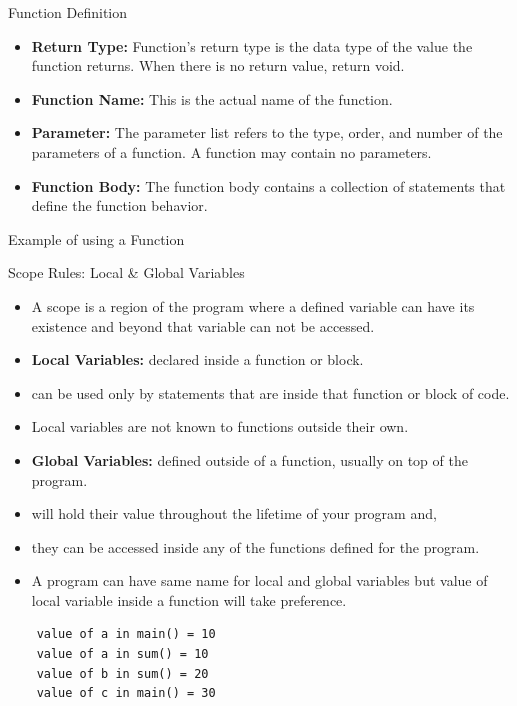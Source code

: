 \documentclass[10pt,t]{beamer}
\begin{document}
\begin{frame}[fragile]{Function Definition}
  \begin{itemize}
  \item \textbf{Return Type:} Function's return type is the data type of the value the function returns. When there is no return value, return void.
  \item \textbf{Function Name:} This is the actual name of the function.
  \item \textbf{Parameter:} The parameter list refers to the type, order, and number of the parameters of a function. A function may contain no parameters.
  \item \textbf{Function Body:} The function body contains a collection of statements that define the function behavior.
  \end{itemize}
  
\end{frame}

\begin{frame}{Example of using a Function}
  
\end{frame}

\begin{frame}{Scope Rules: Local \& Global Variables}
  \begin{itemize}
  \item A scope is a region of the program where a defined variable can have its existence and beyond that variable can not be accessed.
  \item \textbf{\color{lublue}Local Variables:} declared inside a function or block.
  \item[] can be used only by statements that are inside that function or block of code.
  \item[] Local variables are not known to functions outside their own.
  \item \textbf{\color{lublue}Global Variables:}  defined outside of a function, usually on top of the program.
  \item[] will hold their value throughout the lifetime of your program and,
  \item[] they can be accessed inside any of the functions defined for the program.
  \item A program can have same name for local and global variables but value of local variable inside a function will take preference.
  \end{itemize}
  
  \begin{lstlisting}
    value of a in main() = 10
    value of a in sum() = 10
    value of b in sum() = 20
    value of c in main() = 30
  \end{lstlisting}
\end{frame}
\end{document}

